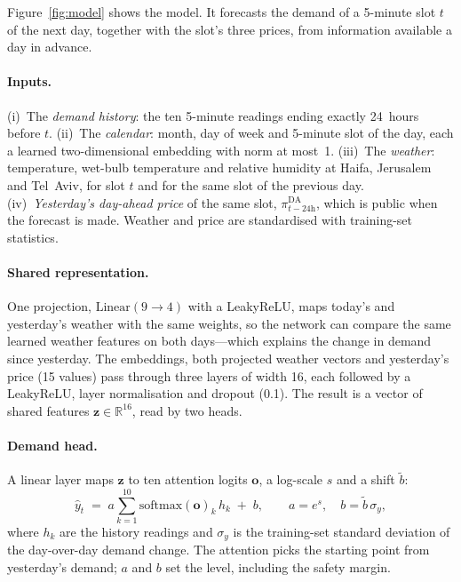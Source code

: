 Figure~\ref{fig:model} shows the model.  It forecasts the demand of a
5-minute slot $t$ of the next day, together with the slot's three prices, from
information available a day in advance.

\paragraph*{Inputs.}  (i)~The \emph{demand history}: the ten 5-minute
readings ending exactly 24~hours before $t$.  (ii)~The \emph{calendar}: month,
day of week and 5-minute slot of the day, each a learned two-dimensional
embedding with norm at most~1.  (iii)~The \emph{weather}: temperature,
wet-bulb temperature and relative humidity at Haifa, Jerusalem and Tel~Aviv,
for slot $t$ and for the same slot of the previous day.  (iv)~\emph{Yesterday's
day-ahead price} of the same slot, $\pi^{\mathrm{DA}}_{t-24\text{h}}$, which is
public when the forecast is made.  Weather and price are standardised with
training-set statistics.

\paragraph*{Shared representation.}  One projection,
$\mathrm{Linear}(9\to4)$ with a LeakyReLU, maps today's and yesterday's weather
with the same weights, so the network can compare the same learned weather
features on both days---which explains the change in demand since yesterday.
The embeddings, both projected weather vectors and yesterday's price (15
values) pass through three layers of width 16, each followed by a LeakyReLU,
layer normalisation and dropout (0.1).  The result is a vector of shared
features $\mathbf{z}\in\mathbb{R}^{16}$, read by two heads.

\paragraph*{Demand head.}  A linear layer maps $\mathbf{z}$ to ten attention
logits $\mathbf{o}$, a log-scale $s$ and a shift $\tilde b$:
\begin{equation}
    \hat{y}_t \;=\; a\sum_{k=1}^{10} \mathrm{softmax}(\mathbf{o})_k\,h_k
              \;+\; b, \qquad a=e^{s},\quad b=\tilde b\,\sigma_y,
    \label{eq:forecast}
\end{equation}
where $h_k$ are the history readings and $\sigma_y$ is the training-set
standard deviation of the day-over-day demand change.  The attention picks the
starting point from yesterday's demand; $a$ and $b$ set the level, including
the safety margin.

